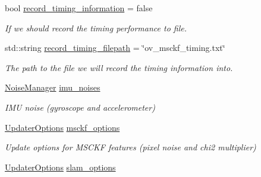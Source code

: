 \begin{DoxyCompactItemize}
bool \hyperlink{structov__msckf_1_1VioManagerOptions_af1c76781e016ae09e49bd4d8e42006e6}{record\+\_\+timing\+\_\+information} = false
\begin{DoxyCompactList}\small\item\em If we should record the timing performance to file. \end{DoxyCompactList}\item 
\mbox{\label{structov__msckf_1_1VioManagerOptions_a3cd20d912a15dc8cbe4b71a5bb9daf89}} 
std\+::string \hyperlink{structov__msckf_1_1VioManagerOptions_a3cd20d912a15dc8cbe4b71a5bb9daf89}{record\+\_\+timing\+\_\+filepath} = \char`\"{}ov\+\_\+msckf\+\_\+timing.\+txt\char`\"{}
\begin{DoxyCompactList}\small\item\em The path to the file we will record the timing information into. \end{DoxyCompactList}\item 
\mbox{\label{structov__msckf_1_1VioManagerOptions_a5c6a088515a0b5440e8ae7987ea70593}} 
\hyperlink{structov__msckf_1_1NoiseManager}{Noise\+Manager} \hyperlink{structov__msckf_1_1VioManagerOptions_a5c6a088515a0b5440e8ae7987ea70593}{imu\+\_\+noises}
\begin{DoxyCompactList}\small\item\em I\+MU noise (gyroscope and accelerometer) \end{DoxyCompactList}\item 
\mbox{\label{structov__msckf_1_1VioManagerOptions_a8e9f183d26954a03cd2da0511d96b0f3}} 
\hyperlink{structov__msckf_1_1UpdaterOptions}{Updater\+Options} \hyperlink{structov__msckf_1_1VioManagerOptions_a8e9f183d26954a03cd2da0511d96b0f3}{msckf\+\_\+options}
\begin{DoxyCompactList}\small\item\em Update options for M\+S\+C\+KF features (pixel noise and chi2 multiplier) \end{DoxyCompactList}\item 
\mbox{\label{structov__msckf_1_1VioManagerOptions_a3972f04e248b39ee50d7a6ef5dfbc086}} 
\hyperlink{structov__msckf_1_1UpdaterOptions}{Updater\+Options} \hyperlink{structov__msckf_1_1VioManagerOptions_a3972f04e248b39ee50d7a6ef5dfbc086}{slam\+\_\+options}

\end{DoxyCompactItemize}
